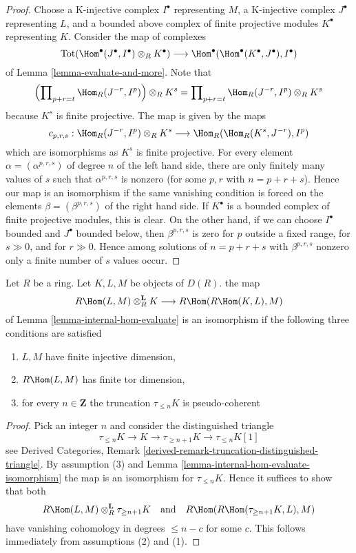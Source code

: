 \begin{proof}
Choose
a K-injective complex $I^\bullet$ representing $M$,
a K-injective complex $J^\bullet$ representing $L$, and
a bounded above complex of finite projective modules $K^\bullet$
representing $K$. Consider the map of complexes
$$
\text{Tot}(\Hom^\bullet(J^\bullet, I^\bullet) \otimes_R K^\bullet)
\longrightarrow
\Hom^\bullet(\Hom^\bullet(K^\bullet, J^\bullet), I^\bullet)
$$
of Lemma \ref{lemma-evaluate-and-more}. Note that
$$
\left(\prod\nolimits_{p + r = t} \Hom_R(J^{-r}, I^p)\right) \otimes_R K^s =
\prod\nolimits_{p + r = t} \Hom_R(J^{-r}, I^p) \otimes_R K^s
$$
because $K^s$ is finite projective. The map is given by the maps
$$
c_{p, r, s} :
\Hom_R(J^{-r}, I^p) \otimes_R K^s
\longrightarrow
\Hom_R(\Hom_R(K^s, J^{-r}), I^p)
$$
which are isomorphisms as $K^s$ is finite projective.
For every element $\alpha = (\alpha^{p, r, s})$
of degree $n$ of the left hand side, there are only finitely
many values of $s$ such that $\alpha^{p, r, s}$ is nonzero
(for some $p, r$ with $n = p + r + s$). Hence our map
is an isomorphism if the same vanishing condition is forced
on the elements $\beta = (\beta^{p, r, s})$ of the right hand side.
If $K^\bullet$ is a bounded complex of finite projective
modules, this is clear. On the other hand, if we can choose
$I^\bullet$ bounded and $J^\bullet$ bounded below, then
$\beta^{p, r, s}$ is zero for $p$ outside a fixed range, for
$s \gg 0$, and for $r \gg 0$. Hence among solutions of $n = p + r + s$
with $\beta^{p, r, s}$ nonzero only a finite number of $s$ values
occur.
\end{proof}

\begin{lemma}
\label{lemma-internal-hom-evaluate-isomorphism-technical}
Let $R$ be a ring. Let $K, L, M$ be objects of $D(R)$.
the map
$$
R\Hom(L, M) \otimes_R^\mathbf{L} K \longrightarrow R\Hom(R\Hom(K, L), M)
$$
of Lemma \ref{lemma-internal-hom-evaluate} is an isomorphism
if the following three conditions are satisfied
\begin{enumerate}
\item $L, M$ have finite injective dimension,
\item $R\Hom(L, M)$ has finite tor dimension,
\item for every $n \in \mathbf{Z}$ the truncation $\tau_{\leq n}K$
is pseudo-coherent
\end{enumerate}
\end{lemma}

\begin{proof}
Pick an integer $n$ and consider the distinguished triangle
$$
\tau_{\leq n}K \to K \to \tau_{\geq n + 1}K \to \tau_{\leq n}K[1]
$$
see Derived Categories, Remark
\ref{derived-remark-truncation-distinguished-triangle}.
By assumption (3) and Lemma \ref{lemma-internal-hom-evaluate-isomorphism}
the map is an isomorphism for $\tau_{\leq n}K$. Hence it
suffices to show that both
$$
R\Hom(L, M) \otimes_R^\mathbf{L} \tau_{\geq n + 1}K
\quad\text{and}\quad
R\Hom(R\Hom(\tau_{\geq n + 1}K, L), M)
$$
have vanishing cohomology in degrees $\leq n - c$ for some $c$.
This follows immediately from assumptions (2) and (1).
\end{proof}

